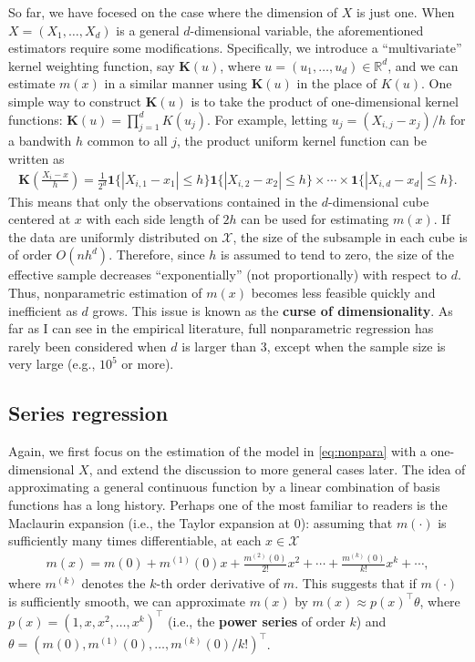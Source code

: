 \documentclass[11pt, A4paper, openany, uplatex]{book}
\begin{document}
So far, we have focesed on the case where the dimension of $X$ is just one.
When $X = (X_1, \ldots, X_d)$ is a general $d$-dimensional variable, the aforementioned estimators require some modifications.
Specifically, we introduce a ``multivariate'' kernel weighting function, say $\mathbf{K}(u)$, where $u = (u_1, \ldots, u_d) \in \mathbb{R}^d$, and we can estimate $m(x)$ in a similar manner using $\mathbf{K}(u)$ in the place of $K(u)$.
One simple way to construct $\mathbf{K}(u)$ is to take the product of one-dimensional kernel functions: $\mathbf{K}(u) = \prod_{j=1}^d K(u_j)$.
For example, letting $u_j = (X_{i,j} -x_j)/h$ for a bandwith $h$ common to all $j$, the product uniform kernel function can be written as
\begin{align*}
	\mathbf{K}\left(\frac{X_i - x}{h}\right) = \frac{1}{2^d}\mathbf{1}\{|X_{i,1} - x_1| \le h\}\mathbf{1}\{|X_{i,2} - x_2| \le h\} \times \cdots \times \mathbf{1}\{|X_{i,d} - x_d| \le h\}.
\end{align*}
This means that only the observations contained in the $d$-dimensional cube centered at $x$ with each side length of $2h$ can be used for estimating $m(x)$.
If the data are uniformly distributed on $\mathcal{X}$, the size of the subsample in each cube is of order $O(nh^d)$.
Therefore, since $h$ is assumed to tend to zero, the size of the effective sample decreases ``exponentially'' (not proportionally) with respect to $d$.
Thus, nonparametric estimation of $m(x)$ becomes less feasible quickly and inefficient as $d$ grows.
This issue is known as the \textbf{curse of dimensionality}.
As far as I can see in the empirical literature, full nonparametric regression has rarely been considered when $d$ is larger than 3, except when the sample size is very large (e.g., $10^5$ or more).

\subsection{Series regression}

Again, we first focus on the estimation of the model in \eqref{eq:nonpara} with a one-dimensional $X$, and extend the discussion to more general cases later.
The idea of approximating a general continuous function by a linear combination of basis functions has a long history.
Perhaps one of the most familiar to readers is the Maclaurin expansion (i.e., the Taylor expansion at 0):
assuming that $m(\cdot)$ is sufficiently many times differentiable, at each $x \in \mathcal{X}$
\begin{align*}
	m(x) = m(0) + m^{(1)}(0)x + \frac{m^{(2)}(0)}{2!}x^2 + \cdots + \frac{m^{(k)}(0)}{k!}x^k + \cdots,
\end{align*}
where $m^{(k)}$ denotes the $k$-th order derivative of $m$.
This suggests that if $m(\cdot)$ is sufficiently smooth, we can approximate $m(x)$ by $m(x) \approx p(x)^\top \theta$, where $p(x) = (1, x, x^2, \ldots, x^k)^\top$ (i.e., the \textbf{power series} of order $k$) and $\theta = (m(0), m^{(1)}(0), \ldots, m^{(k)}(0)/k!)^\top$.
\end{document}
